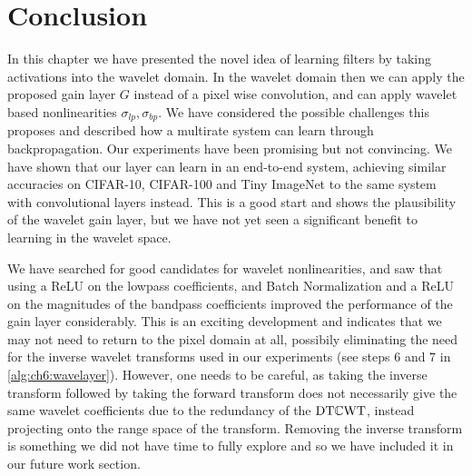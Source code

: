\section{Conclusion}
In this chapter we have presented the novel idea of learning filters by taking
activations into the wavelet domain. In the wavelet domain then we can apply
the proposed gain layer $G$ instead of a pixel wise convolution, and can apply
wavelet based nonlinearities $\sigma_{lp}, \sigma_{bp}$. We have considered the possible
challenges this proposes and described how a multirate system can learn through
backpropagation. 
Our experiments have been promising but not convincing. We have shown that our layer can learn in an
end-to-end system, achieving similar accuracies on CIFAR-10, CIFAR-100 and Tiny
ImageNet to the same system with convolutional layers instead. This is a good
start and shows the plausibility of the wavelet gain layer, but we have not yet
seen a significant benefit to learning in the wavelet space. 

We have searched for good candidates for wavelet nonlinearities, and saw that
using a ReLU on the lowpass coefficients, and
Batch Normalization and a ReLU on the magnitudes of the bandpass coefficients
improved the performance of the gain layer considerably. This is an exciting
development and indicates that we may not need to return to the pixel domain at
all, possibily eliminating the need for the inverse wavelet
transforms used in our experiments (see steps 6 and 7 in
\autoref{alg:ch6:wavelayer}). However, one needs to be careful, as taking the inverse transform 
followed by taking the forward transform does not necessarily give the same
wavelet coefficients due to the redundancy of the $\mathrm{DT}\mathbb{C}\mathrm{WT}$, instead projecting
onto the range space of the transform. Removing the inverse transform is
something we did not have time to fully explore and so we have included it in
our future work section. 
